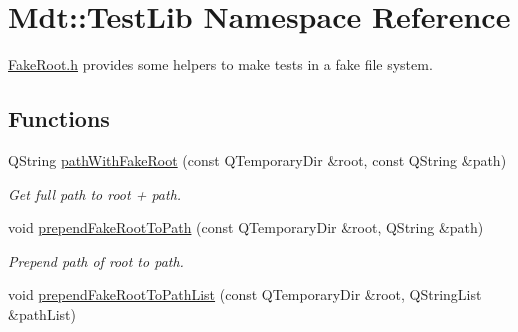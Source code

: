 \hypertarget{namespace_mdt_1_1_test_lib}{}\section{Mdt\+:\+:Test\+Lib Namespace Reference}
\label{namespace_mdt_1_1_test_lib}


\hyperlink{_fake_root_8h_source}{Fake\+Root.\+h} provides some helpers to make tests in a fake file system.  


\subsection*{Functions}
\begin{DoxyCompactItemize}
\item 
Q\+String \hyperlink{namespace_mdt_1_1_test_lib_a5d165ffbf0595a09fd01a820d684f44b}{path\+With\+Fake\+Root} (const Q\+Temporary\+Dir \&root, const Q\+String \&path)
\begin{DoxyCompactList}\small\item\em Get full path to root + path. \end{DoxyCompactList}\item 
void \hyperlink{namespace_mdt_1_1_test_lib_a78b4dd3df02000c3eb29e94495c78246}{prepend\+Fake\+Root\+To\+Path} (const Q\+Temporary\+Dir \&root, Q\+String \&path)\hypertarget{namespace_mdt_1_1_test_lib_a78b4dd3df02000c3eb29e94495c78246}{}\label{namespace_mdt_1_1_test_lib_a78b4dd3df02000c3eb29e94495c78246}

\begin{DoxyCompactList}\small\item\em Prepend path of {\itshape root} to {\itshape path}. \end{DoxyCompactList}\item 
void \hyperlink{namespace_mdt_1_1_test_lib_ad65fc937f35c685a13dc5b42fc405d0a}{prepend\+Fake\+Root\+To\+Path\+List} (const Q\+Temporary\+Dir \&root, Q\+String\+List \&path\+List)\hypertarget{namespace_mdt_1_1_test_lib_ad65fc937f35c685a13dc5b42fc405d0a}{}\label{namespace_mdt_1_1_test_lib_ad65fc937f35c685a13dc5b42fc405d0a}


\end{DoxyCompactItemize}
